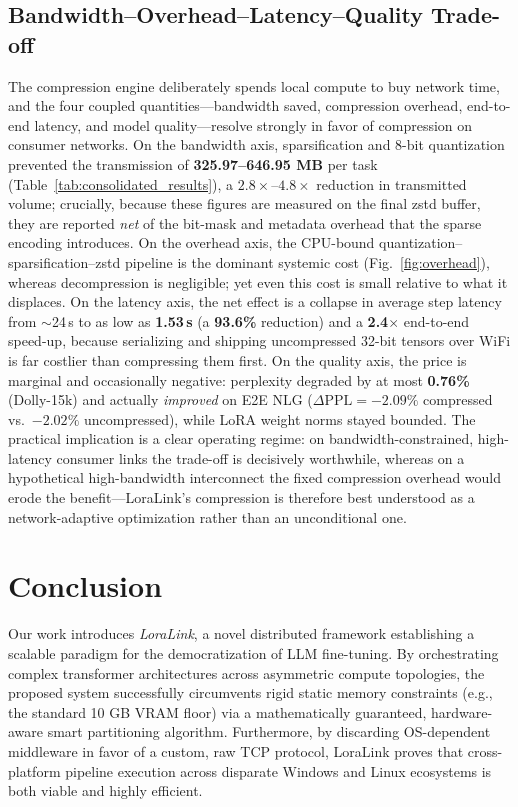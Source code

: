 \documentclass{ieeeaccess}
\begin{document}
\subsection{Bandwidth--Overhead--Latency--Quality Trade-off}
The compression engine deliberately spends local compute to buy network time, and the four coupled quantities---bandwidth saved, compression overhead, end-to-end latency, and model quality---resolve strongly in favor of compression on consumer networks. On the bandwidth axis, sparsification and 8-bit quantization prevented the transmission of \textbf{325.97--646.95 MB} per task (Table~\ref{tab:consolidated_results}), a $2.8\times$--$4.8\times$ reduction in transmitted volume; crucially, because these figures are measured on the final zstd buffer, they are reported \emph{net} of the bit-mask and metadata overhead that the sparse encoding introduces. On the overhead axis, the CPU-bound quantization--sparsification--zstd pipeline is the dominant systemic cost (Fig.~\ref{fig:overhead}), whereas decompression is negligible; yet even this cost is small relative to what it displaces. On the latency axis, the net effect is a collapse in average step latency from $\sim$24\,s to as low as \textbf{1.53\,s} (a \textbf{93.6\%} reduction) and a \textbf{2.4$\times$} end-to-end speed-up, because serializing and shipping uncompressed 32-bit tensors over WiFi is far costlier than compressing them first. On the quality axis, the price is marginal and occasionally negative: perplexity degraded by at most \textbf{0.76\%} (Dolly-15k) and actually \emph{improved} on E2E NLG ($\Delta\text{PPL} = -2.09\%$ compressed vs.\ $-2.02\%$ uncompressed), while LoRA weight norms stayed bounded. The practical implication is a clear operating regime: on bandwidth-constrained, high-latency consumer links the trade-off is decisively worthwhile, whereas on a hypothetical high-bandwidth interconnect the fixed compression overhead would erode the benefit---LoraLink's compression is therefore best understood as a network-adaptive optimization rather than an unconditional one.

\section{Conclusion}

Our work introduces \textit{LoraLink}, a novel distributed framework establishing a scalable paradigm for the democratization of LLM fine-tuning. By orchestrating complex transformer architectures across asymmetric compute topologies, the proposed system successfully circumvents rigid static memory constraints (e.g., the standard 10 GB VRAM floor) via a mathematically guaranteed, hardware-aware smart partitioning algorithm. Furthermore, by discarding OS-dependent middleware in favor of a custom, raw TCP protocol, LoraLink proves that cross-platform pipeline execution across disparate Windows and Linux ecosystems is both viable and highly efficient.
\end{document}
